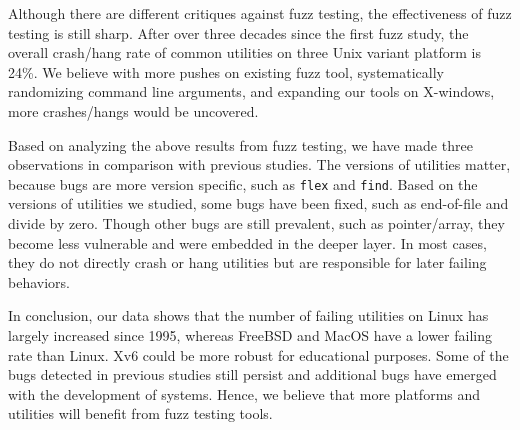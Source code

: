 
Although there are different critiques against fuzz testing, the effectiveness of fuzz testing is still sharp. After over three decades since the first fuzz study, the overall crash/hang rate of common utilities on three Unix variant platform is 24\%. We believe with more pushes on existing fuzz tool, systematically randomizing command line arguments, and expanding our tools on X-windows, more crashes/hangs would be uncovered. 

Based on analyzing the above results from fuzz testing, we have made three observations in comparison with previous studies. The versions of utilities matter, because bugs are more version specific, such as \texttt{flex} and \texttt{find}. Based on the versions of utilities we studied, some bugs have been fixed, such as end-of-file and divide by zero. Though other bugs are still prevalent, such as pointer/array, they become less vulnerable and were embedded in the deeper layer. In most cases, they do not directly crash or hang utilities but are responsible for later failing behaviors. 

In conclusion, our data shows that the number of failing utilities on Linux has largely increased since 1995, whereas FreeBSD and MacOS have a lower failing rate than Linux. Xv6 could be more robust for educational purposes. Some of the bugs detected in previous studies still persist and additional bugs have emerged with the development of systems. Hence, we believe that more platforms and utilities will benefit from fuzz testing tools.